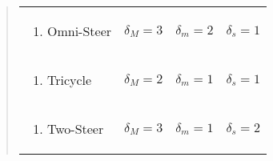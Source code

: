 \begin{quote}
\begin{longtable}[]{@{}llll@{}}
\begin{minipage}[t]{0.18\columnwidth}\raggedright
\begin{enumerate}
\def\labelenumi{\Alph{enumi}.}
\setcounter{enumi}{2}
\tightlist
\item
  Omni-Steer
\end{enumerate}\strut
\end{minipage} & \begin{minipage}[t]{0.23\columnwidth}\raggedright
\(\delta_M = 3\)\strut
\end{minipage} & \begin{minipage}[t]{0.23\columnwidth}\raggedright
\(\delta_m = 2\)\strut
\end{minipage} & \begin{minipage}[t]{0.23\columnwidth}\raggedright
\(\delta_s = 1\)\strut
\end{minipage}\tabularnewline
\begin{minipage}[t]{0.18\columnwidth}\raggedright
\begin{enumerate}
\def\labelenumi{\Alph{enumi}.}
\setcounter{enumi}{3}
\tightlist
\item
  Tricycle
\end{enumerate}\strut
\end{minipage} & \begin{minipage}[t]{0.23\columnwidth}\raggedright
\(\delta_M = 2\)\strut
\end{minipage} & \begin{minipage}[t]{0.23\columnwidth}\raggedright
\(\delta_m = 1\)\strut
\end{minipage} & \begin{minipage}[t]{0.23\columnwidth}\raggedright
\(\delta_s = 1\)\strut
\end{minipage}\tabularnewline
\begin{minipage}[t]{0.18\columnwidth}\raggedright
\begin{enumerate}
\def\labelenumi{\Alph{enumi}.}
\setcounter{enumi}{4}
\tightlist
\item
  Two-Steer
\end{enumerate}\strut
\end{minipage} & \begin{minipage}[t]{0.23\columnwidth}\raggedright
\(\delta_M = 3\)\strut
\end{minipage} & \begin{minipage}[t]{0.23\columnwidth}\raggedright
\(\delta_m = 1\)\strut
\end{minipage} & \begin{minipage}[t]{0.23\columnwidth}\raggedright
\(\delta_s = 2\)\strut
\end{minipage}\tabularnewline
\bottomrule
\end{longtable}
\end{quote}
